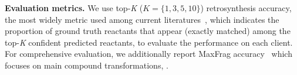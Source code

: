 \noindent\textbf{Evaluation metrics.} 
We use top-\textit{K} ($\textit{K} = \{1,3,5,10\}$) retrosynthesis accuracy, the most widely metric used among current literatures~\citep{liu2017retrosynthetic,karpov2019transformer,kim2021valid,sacha2021molecule,wang2021retroprime,zhong2022root,zhong2023retrosynthesis}, which indicates the proportion of ground truth reactants that appear (exactly matched) among the top-\textit{K} confident predicted reactants, to evaluate the performance on each client. For comprehensive evaluation, we additionally report MaxFrag accuracy~\citep{tetko2020state} which focuses on main compound transformations, .

